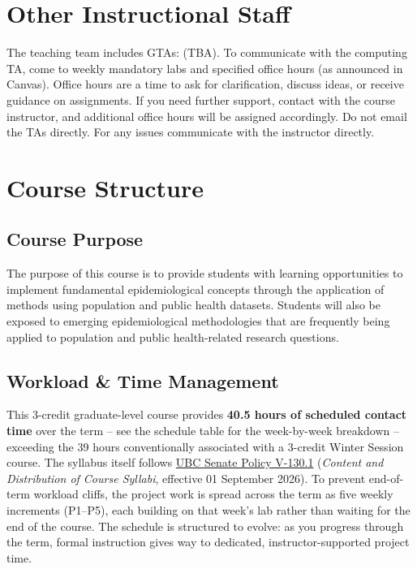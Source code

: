 \documentclass[
]{article}
\begin{document}
\section{Other Instructional Staff}\label{other-instructional-staff}

The teaching team includes GTAs: (TBA). To communicate with the
computing TA, come to weekly mandatory labs and specified office hours
(as announced in Canvas). Office hours are a time to ask for
clarification, discuss ideas, or receive guidance on assignments. If you
need further support, contact with the course instructor, and additional
office hours will be assigned accordingly. Do not email the TAs
directly. For any issues communicate with the instructor directly.

\section{Course Structure}\label{course-structure}

\subsection{Course Purpose}\label{course-purpose}

The purpose of this course is to provide students with learning
opportunities to implement fundamental epidemiological concepts through
the application of methods using population and public health datasets.
Students will also be exposed to emerging epidemiological methodologies
that are frequently being applied to population and public
health-related research questions.

\subsection{Workload \& Time Management}\label{workload-time-management}

This 3-credit graduate-level course provides \textbf{40.5 hours of
scheduled contact time} over the term -- see the schedule table for the
week-by-week breakdown -- exceeding the 39 hours conventionally
associated with a 3-credit Winter Session course. The syllabus itself
follows
\href{https://scs-senate-2021.sites.olt.ubc.ca/files/20260218_V-130_Approved-1.pdf}{UBC
Senate Policy V-130.1} (\emph{Content and Distribution of Course
Syllabi}, effective 01 September 2026). To prevent end-of-term workload
cliffs, the project work is spread across the term as five weekly
increments (P1--P5), each building on that week's lab rather than
waiting for the end of the course. The schedule is structured to evolve:
as you progress through the term, formal instruction gives way to
dedicated, instructor-supported project time.
\end{document}

